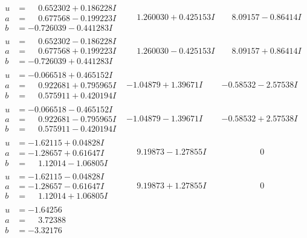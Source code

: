 \documentclass[1p]{elsarticle_modified}
\theoremstyle{definition}
\begin{document}
$$\begin{array}{c|c|c}
\begin{aligned}
u &= \phantom{-}0.652302 + 0.186228 I \\
a &= \phantom{-}0.677568 - 0.199223 I \\
b &= -0.726039 - 0.441283 I\end{aligned}
 & \phantom{-}1.260030 + 0.425153 I & \phantom{-}8.09157 - 0.86414 I \\ \hline\begin{aligned}
u &= \phantom{-}0.652302 - 0.186228 I \\
a &= \phantom{-}0.677568 + 0.199223 I \\
b &= -0.726039 + 0.441283 I\end{aligned}
 & \phantom{-}1.260030 - 0.425153 I & \phantom{-}8.09157 + 0.86414 I \\ \hline\begin{aligned}
u &= -0.066518 + 0.465152 I \\
a &= \phantom{-}0.922681 + 0.795965 I \\
b &= \phantom{-}0.575911 + 0.420194 I\end{aligned}
 & -1.04879 + 1.39671 I & -0.58532 - 2.57538 I \\ \hline\begin{aligned}
u &= -0.066518 - 0.465152 I \\
a &= \phantom{-}0.922681 - 0.795965 I \\
b &= \phantom{-}0.575911 - 0.420194 I\end{aligned}
 & -1.04879 - 1.39671 I & -0.58532 + 2.57538 I \\ \hline\begin{aligned}
u &= -1.62115 + 0.04828 I \\
a &= -1.28657 + 0.61647 I \\
b &= \phantom{-}1.12014 - 1.06805 I\end{aligned}
 & \phantom{-}9.19873 - 1.27855 I & \phantom{-0.000000 } 0 \\ \hline\begin{aligned}
u &= -1.62115 - 0.04828 I \\
a &= -1.28657 - 0.61647 I \\
b &= \phantom{-}1.12014 + 1.06805 I\end{aligned}
 & \phantom{-}9.19873 + 1.27855 I & \phantom{-0.000000 } 0 \\ \hline\begin{aligned}
u &= -1.64256\phantom{ +0.000000I} \\
a &= \phantom{-}3.72388\phantom{ +0.000000I} \\
b &= -3.32176\phantom{ +0.000000I}\end{aligned}

\end{array}$$
\end{document}
